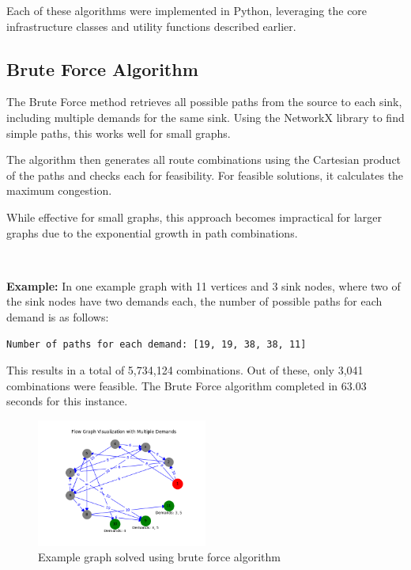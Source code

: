\documentclass[a4paper,12pt]{article}
\begin{document}
\noindent Each of these algorithms were implemented in Python, leveraging the core infrastructure classes and utility functions described earlier.

\subsection{Brute Force Algorithm}

The Brute Force method retrieves all possible paths from the source to each sink, including multiple demands for the same sink. Using the NetworkX library to find simple paths, this works well for small graphs.

\noindent The algorithm then generates all route combinations using the Cartesian product of the paths and checks each for feasibility. For feasible solutions, it calculates the maximum congestion.

\noindent While effective for small graphs, this approach becomes impractical for larger graphs due to the exponential growth in path combinations.

\

\noindent \textbf{Example:}
In one example graph with 11 vertices and 3 sink nodes, where two of the sink nodes have two demands each, the number of possible paths for each demand is as follows:

\begin{verbatim}
Number of paths for each demand: [19, 19, 38, 38, 11]
\end{verbatim}

\noindent This results in a total of 5,734,124 combinations. Out of these, only 3,041 combinations were feasible. The Brute Force algorithm completed in 63.03 seconds for this instance.

\begin{figure}[H]
    \centering
    \includegraphics[width=0.5\textwidth]{brute-force-example.png}
    \caption{Example graph solved using brute force algorithm}
\end{figure}
\end{document}

